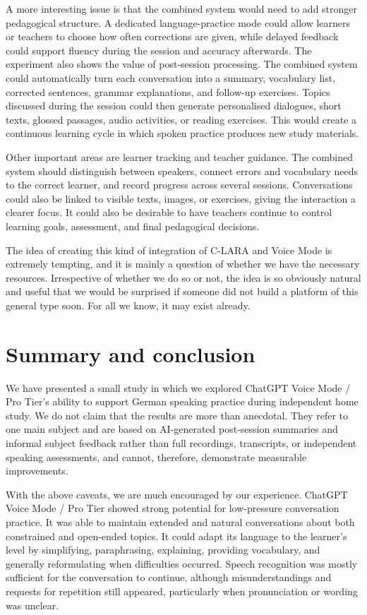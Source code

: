 \documentclass[11pt,a4paper]{article}
\begin{document}
A more interesting issue is that the combined system would need to add stronger pedagogical structure. A dedicated language-practice mode could allow learners or teachers to choose how often corrections are given, while delayed feedback could support fluency during the session and accuracy afterwards. The experiment also shows the value of post-session processing. The combined system could automatically turn each conversation into a summary, vocabulary list, corrected sentences, grammar explanations, and follow-up exercises. Topics discussed during the session could then generate personalised dialogues, short texts, glossed passages, audio activities, or reading exercises. This would create a continuous learning cycle in which spoken practice produces new study materials.

Other important areas are learner tracking and teacher guidance. The combined system should distinguish between speakers, connect errors and vocabulary needs to the correct learner, and record progress across several sessions. Conversations could also be linked to visible texts, images, or exercises, giving the interaction a clearer focus. It could also be desirable to have teachers continue to control learning goals, assessment, and final pedagogical decisions.

The idea of creating this kind of integration of C-LARA and Voice Mode is extremely tempting, and it is mainly a question of whether we have the necessary resources. Irrespective of whether we do so or not, the idea is so obviously natural and useful that we would be surprised if someone did not build a platform of this general type soon. For all we know, it may exist already.

\section{Summary and conclusion}

We have presented a small study in which we explored ChatGPT Voice Mode / Pro Tier's ability to support German speaking practice during independent home study. We do not claim that the results are more than anecdotal. They refer to one main subject and are based on AI-generated post-session summaries and informal subject feedback rather than full recordings, transcripts, or independent speaking assessments, and cannot, therefore, demonstrate measurable improvements.

With the above caveats, we are much encouraged by our experience. ChatGPT Voice Mode / Pro Tier showed strong potential for low-pressure conversation practice. It was able to maintain extended and natural conversations about both constrained and open-ended topics. It could adapt its language to the learner's level by simplifying, paraphrasing, explaining, providing vocabulary, and generally reformulating when difficulties occurred. Speech recognition was mostly sufficient for the conversation to continue, although misunderstandings and requests for repetition still appeared, particularly when pronunciation or wording was unclear.
\end{document}
